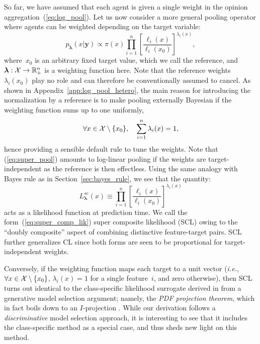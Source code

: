 \documentclass[english]{scrartcl}
\def\y{{\mathbf{y}}}
\newcommand{\blambda}{{\boldsymbol{\lambda}}}
\begin{document}
So far, we have assumed that each agent is given a single weight in the opinion aggregation~(\ref{eq:log_pool}). Let us now consider a more general pooling operator where agents can be weighted depending on the target variable:
\begin{equation}
\label{eq:super_pool}
p_\blambda(x|\y) \propto \pi(x) \prod_{i=1}^n \left[\frac{\ell_i(x)}{\ell_i(x_0)}\right]^{\lambda_i(x)},    
\end{equation}
where~$x_0$ is an arbitrary fixed target value, which we call the reference, and $\blambda: {\cal X}\to \mathbb{R}_+^n$ is a weighting function here. Note that the reference weights $\lambda_i(x_0)$ play no role and can therefore be conventionally assumed to cancel. As shown in Appendix~\ref{app:log_pool_hetero}, the main reason for introducing the normalization by a reference is to make pooling externally Bayesian if the weighting function sums up to one uniformly,
$$
\forall x\in{\cal X}\setminus \{x_0\},\quad
\sum_{i=1}^n \lambda_i(x) = 1,
$$
hence providing a sensible default rule to tune the weights. Note that (\ref{eq:super_pool}) amounts to log-linear pooling if the weights are target-independent as the reference is then effectless. Using the same analogy with Bayes rule as in Section~\ref{sec:bayes_rule}, we see that the quantity:
\begin{equation}
\label{eq:super_comp_lik}
L^{sc}_\blambda(x) \equiv 
\prod_{i=1}^n \left[\frac{\ell_i(x)}{\ell_i(x_0)}\right]^{\lambda_i(x)}
\end{equation} 
acts as a likelihood function at prediction time. We call the form~(\ref{eq:super_comp_lik}) super composite likelihood (SCL) owing to the ``doubly composite'' aspect of combining distinctive feature-target pairs. SCL further generalizes CL since both forms are seen to be proportional for target-independent weights. 

Conversely, if the weighting function maps each target to a unit vector ({\em i.e.}, $\forall x\in{\cal X}\setminus \{x_0\}$, $\lambda_i(x)=1$ for a single feature~$i$, and zero otherwise), then SCL turns out identical to the class-specific likelihood surrogate derived in \cite{Baggenstoss-03} from a generative model selection argument; namely, the {\em PDF projection theorem}, which in fact boils down to an $I$-projection \cite{Minka-04}. While our derivation follows a {\em discriminative} model selection approach, it is interesting to see that it includes the class-specific method as a special case, and thus sheds new light on this method.
\end{document}
